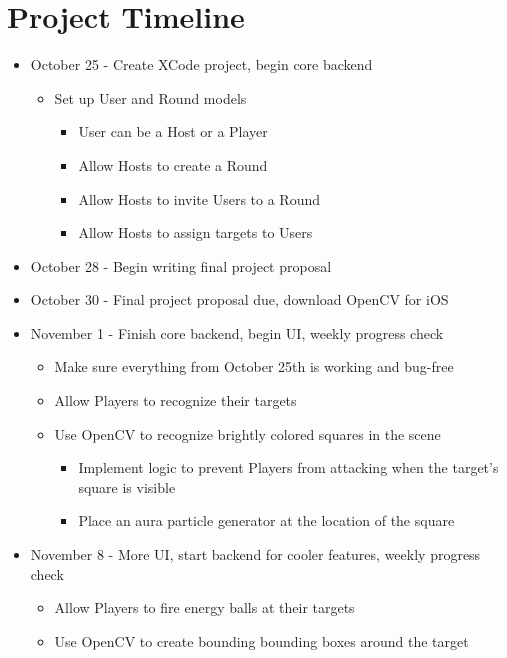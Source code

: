 \documentclass{article}
\begin{document}
\section{Project Timeline}

\begin{itemize}
  \item October 25 - Create XCode project, begin core backend 
    \begin{itemize}
      \item Set up User and Round models
      \begin{itemize}
        \item User can be a Host or a Player
        \item Allow Hosts to create a Round
        \item Allow Hosts to invite Users to a Round 
        \item Allow Hosts to assign targets to Users
      \end{itemize}
    \end{itemize}
  \item October 28 - Begin writing final project proposal
  \item October 30 - Final project proposal due, download OpenCV for iOS
  \item November 1 - Finish core backend, begin UI, weekly progress check
    \begin{itemize}
      \item Make sure everything from October 25th is working and bug-free
      \item Allow Players to recognize their targets 
      \item Use OpenCV to recognize brightly colored squares in the scene
      \begin{itemize}
        \item Implement logic to prevent Players from attacking when the
          target's square is visible
        \item Place an aura particle generator at the location of the square
      \end{itemize}
    \end{itemize}
  \item November 8 - More UI, start backend for cooler features, weekly progress check 
    \begin{itemize}
      \item Allow Players to fire energy balls at their targets 
      \item Use OpenCV to create bounding bounding boxes around the target

\end{itemize}
\end{itemize}
\end{document}
